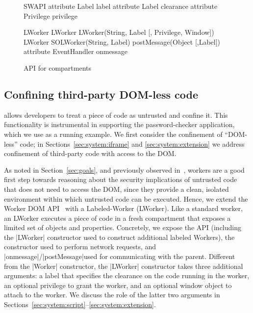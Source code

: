 \begin{figure}
{\small
\begin{webidl}
SWAPI {
  attribute Label label
  attribute Label clearance 
  attribute Privilege privilege
}
\end{webidl}
\begin{webidl}
LWorker {
  LWorker LWorker(String, Label
                  [, Privilege, Window])
  LWorker SOLWorker(String, Label)
  postMessage(Object [,Label])
  attribute EventHandler onmessage
}
\end{webidl}
}
\vspace{-10pt}
\caption{\label{systemAPI} API for compartments}
\vspace{-10pt}
\end{figure}


\subsection{Confining third-party DOM-less code}
\label{sec:system:worker}

%
%
%
\sys{} allows developers to treat a piece of code as untrusted and
confine it. This functionality is instrumental in supporting the
password-checker application, which we use as a running example.
%
We first consider the confinement of ``DOM-less'' code; in
Sections~\ref{sec:system:iframe} and \ref{sec:system:extension} we
address confinement of third-party code with access to the DOM.

As noted in Section~\ref{sec:goals}, and previously observed
in~\cite{Ingram:2012}, workers are a good first step towards reasoning
about the security implications of untrusted code that does not need
to access the DOM, since they provide a clean, isolated environment
within which untrusted code can be executed.
%
Hence, we extend the Worker DOM API~\cite{workers} with a
Labeled-Worker (LWorker).
%
Like a standard worker, an LWorker executes a piece of code in a fresh
compartment that exposes a limited set of objects and properties.
%
Concretely, we expose the \sys{} API (including the \js|LWorker|
constructor used to construct additional labeled Workers), the \xhr{}
constructor used to perform network requests, and
\js|onmessage|/\js|postMessage|used for communicating with the
parent.
%
Different from the \js|Worker| constructor, the \js|LWorker|
constructor takes three additional arguments: a label that specifies the
clearance on the code running in the worker, an optional privilege
to grant the worker, and an optional window object to attach to the worker.
%
We discuss the role of the latter two arguments in Sections~\ref{sec:system:script}--\ref{sec:system:extension}.

